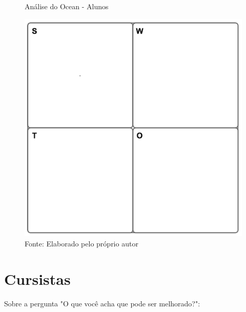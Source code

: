 \begin{figure}[H]
\caption{Análise do Ocean - Alunos}
\centerline{\includegraphics[scale=0.75]{img/generalswot}}
\label{fig:swotalunos}
\caption* {Fonte: Elaborado pelo próprio autor}
\end{figure}

\section{Cursistas}

Sobre a pergunta "O que você acha que pode ser melhorado?":

